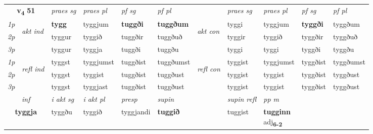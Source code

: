 \noindent
\begin{tabular}{lllllllllll} \toprule
\multicolumn{2}{c}{\textbf{v{\textsubscript{4}}} \Large{\textbf{51}}}  &  \textit{praes sg}  & \textit{praes pl}  &\textit{ pf sg} & \textit{pf pl} &  &  \textit{praes sg}  & \textit{praes pl}  & \textit{pf sg} & \textit{pf pl } \\*
	\cmidrule{3-6} \cmidrule{8-11}
 {\textit{1p}} & \multirow{3}{*}{\begin{turn}{90}\textit{akt ind}\end{turn}} & \textbf{tygg} & tyggjum & \textbf{tuggði} & \textbf{tuggðum} & \multirow{3}{*}{\begin{turn}{90}\textit{akt con}\end{turn}} &tyggi & tyggjum & \textbf{tyggði} & tyggðum\\*
 {\textit{2p}} &  &  tyggur  & tyggið & tuggðir & tuggðuð & & tyggir & tyggið & tyggðir & tyggðuð \\*
{\textit{3p}} &  & tyggur & tyggja & tuggði & tuggðu & & tyggi & tyggi& tyggði & tyggðu \\*
\cmidrule{3-6} \cmidrule{8-11}
 {\textit{1p}} & \multirow{3}{*}{\begin{turn}{90}\textit{refl ind}\end{turn}}  & tyggst & tyggjumst & tuggðist & tuggðumst & \multirow{3}{*}{\begin{turn}{90}\textit{refl con}\end{turn}}  &tyggist & tyggjumst & tyggðist & tyggðumst \\*
 {\textit{2p}} &  & tyggst & tyggist & tuggðist & tuggðust & &tyggist & tyggist & tyggðist & tyggðust \\*
 {\textit{3p}}  & & tyggst & tyggjast & tuggðist & tuggðust & & tyggist & tyggist& tyggðist & tyggðust \\*
\cmidrule{3-6} \cmidrule{8-11}

   \multicolumn{2}{c}{\textit{inf}}  & \textit{i akt sg} & \textit{i akt pl}   & \textit{presp} & \textit{supin} && \textit{supin refl} & \textit{pp m} \\*
  \multicolumn{2}{c}{\textbf{tyggja}} & tyggðu  & tyggið   & tyggjandi &  \textbf{tuggið} && tuggist & \specialcell{\textbf{tugginn} \\ adj\textbf{\textsubscript{6-2}}} \\*
\end{tabular}

